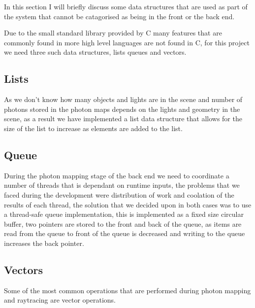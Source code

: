 In this section I will briefly discuss some data structures that are used as part of the system that cannot
be catagorised as being in the front or the back end.

Due to the small standard library provided by C many features that are commonly found in more high level languages are not
found in C, for this project we need three such data structures, lists queues and vectors.

\subsection{Lists}
As we don't know how many objects and lights are in the scene and number of photons stored in the photon maps depends on the
lights and geometry in the scene, as a result we have implemented a list data structure that allows for the size of the list
to increase as elements are added to the list.

\subsection{Queue}
During the photon mapping stage of the back end we need to coordinate a number of threads that is dependant on runtime inputs,
the problems that we faced during the development were distribution of work and coolation of the results of each thread,
the solution that we decided upon in both cases was to use a thread-safe queue implementation, this is implemented as a
fixed size circular buffer, two pointers are stored to the front and back of the queue, as items are read from the queue to
front of the queue is decreased and writing to the queue increases the back pointer.

\subsection{Vectors}
Some of the most common operations that are performed during photon mapping and raytracing are vector operations.
